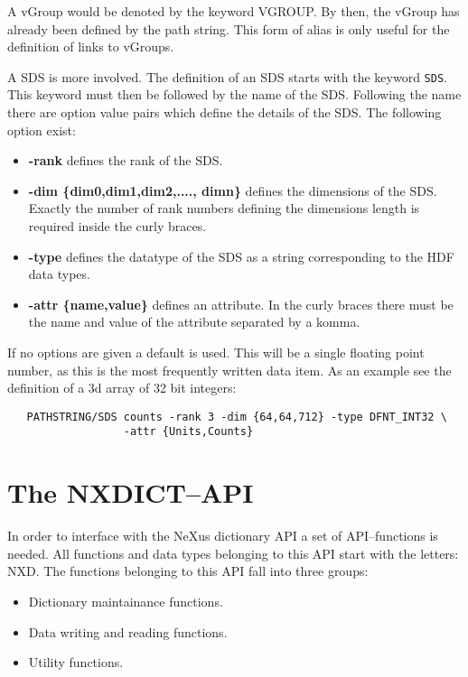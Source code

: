 \documentclass[12pt]{article}
\begin{document}
 A vGroup would be denoted by the keyword VGROUP. By then, the vGroup has
 already been defined by the path string. This form of alias is only useful
 for the definition of links to vGroups.

 A SDS is more involved. The definition of an SDS starts with the keyword
 \verb+SDS+. This keyword must then be followed by the name of the SDS.
 Following the name there are option value pairs which define the 
  details of the SDS. The following option exist:
 \begin{itemize}
  \item {\bf -rank} defines the rank of the SDS.
  \item {\bf -dim \{dim0,dim1,dim2,...., dimn\} } defines the dimensions of the
       SDS. Exactly the number of rank numbers defining the dimensions
 length is required inside the curly braces. 
  \item {\bf -type} defines the datatype of the SDS as a string corresponding
  to the HDF data types.
  \item {\bf -attr \{name,value\} } defines an attribute. In the curly braces
   there must be the name and value of the attribute separated by a komma.
  \end{itemize}
  If no options are given a default is used. This will be a single floating
  point number, as this is the most frequently written data item. As an 
  example see the definition of a 3d array of 32 bit integers:
  \begin{verbatim}
   PATHSTRING/SDS counts -rank 3 -dim {64,64,712} -type DFNT_INT32 \
                  -attr {Units,Counts}      

  \end{verbatim}

  \section{The NXDICT--API}
  In order to interface with the NeXus dictionary API a set of
  API--functions is needed. All functions and data types belonging to
  this API start with the letters: NXD. The functions belonging to this API
  fall into three groups:
  \begin{itemize}
   \item Dictionary maintainance functions.
   \item Data writing and reading functions.
   \item Utility functions.
  \end{itemize}
  
\end{document}
